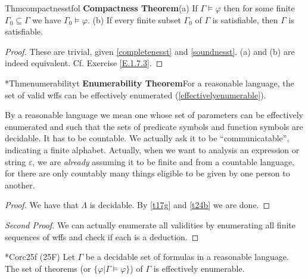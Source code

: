 
\begin{reference}{Thm}{compactnesstfol}
  \textbf{Compactness Theorem}\quad(a) If $\Gamma\vDash \varphi$ then for some finite $\Gamma_0\subseteq \Gamma$ we have $\Gamma_0\vDash \varphi$. (b) If every finite subset $\Gamma_0$ of $\Gamma$ is satisfiable, then $\Gamma$ is satisfiable.
\end{reference}

\begin{proof}
  These are trivial, given \ref{completenesst} and \ref{soundnesst}. (a) and (b) are indeed equivalent. Cf. Exercise \ref{E.1.7.3}.
\end{proof}


\begin{reference}{*Thm}{enumerabilityt}
  \textbf{Enumerability Theorem}\quad For a reasonable language, the set of valid wffs can be effectively enumerated (\ref{effectivelyenumerable}).
\end{reference}


By a reasonable language we mean one whose set of parameters can be effectively enumerated and such that the sets of predicate symbols and function symbols are decidable. It has to be countable. We actually ask it to be ``communicatable'', indicating a finite alphabet. Actually, when we want to analysis an expression or string $\varepsilon$, we are \textit{already} assuming it to be finite and from a countable language, for there are only countably many things eligible to be given by one person to another.

\begin{proof}
  We have that $\Lambda$ is decidable. By \ref{t17g} and \ref{t24b} we are done.
\end{proof}

\begin{proof}[Second Proof]
  We can actually enumerate all validities by enumerating all finite sequences of wffs and check if each is a deduction.
\end{proof}

\begin{reference}{*Cor}{c25f}
  (25F) Let $\Gamma$ be a decidable set of formulas in a reasonable language. The set of theorems (or $\{\varphi|\Gamma\vDash \varphi\}$) of $\Gamma$ is effectively enumerable.
\end{reference}

